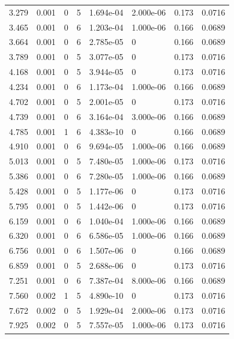 \documentclass[preview]{standalone}
\begin{document}
{{\begin{tabular}{L{1.2cm}C{1.2cm} C{0.3cm}C{0.5cm} C{1.4cm}C{1.4cm} C{1.4cm}C{1.4cm}}
  3.279  &  0.001  & 0     &  5 &  1.694e-04  & 2.000e-06  & 0.173 &  0.0716   \\ 
  3.465  &  0.001  & 0     &  6 &  1.203e-04  & 1.000e-06  & 0.166 &  0.0689   \\ 
  3.664  &  0.001  & 0     &  6 &  2.785e-05  & 0  & 0.166 &  0.0689   \\ 
  3.789  &  0.001  & 0     &  5 &  3.077e-05  & 0  & 0.173 &  0.0716   \\ 
  4.168  &  0.001  & 0     &  5 &  3.944e-05  & 0  & 0.173 &  0.0716   \\ 
  4.234  &  0.001  & 0     &  6 &  1.173e-04  & 1.000e-06  & 0.166 &  0.0689   \\ 
  4.702  &  0.001  & 0     &  5 &  2.001e-05  & 0  & 0.173 &  0.0716   \\ 
  4.739  &  0.001  & 0     &  6 &  3.164e-04  & 3.000e-06  & 0.166 &  0.0689   \\ 
  4.785  &  0.001  & 1     &  6 &  4.383e-10  & 0  & 0.166 &  0.0689   \\ 
  4.910  &  0.001  & 0     &  6 &  9.694e-05  & 1.000e-06  & 0.166 &  0.0689   \\ 
  5.013  &  0.001  & 0     &  5 &  7.480e-05  & 1.000e-06  & 0.173 &  0.0716   \\ 
  5.386  &  0.001  & 0     &  6 &  7.280e-05  & 1.000e-06  & 0.166 &  0.0689   \\ 
  5.428  &  0.001  & 0     &  5 &  1.177e-06  & 0  & 0.173 &  0.0716   \\ 
  5.795  &  0.001  & 0     &  5 &  1.442e-06  & 0  & 0.173 &  0.0716   \\ 
  6.159  &  0.001  & 0     &  6 &  1.040e-04  & 1.000e-06  & 0.166 &  0.0689   \\ 
  6.320  &  0.001  & 0     &  6 &  6.586e-05  & 1.000e-06  & 0.166 &  0.0689   \\ 
  6.756  &  0.001  & 0     &  6 &  1.507e-06  & 0  & 0.166 &  0.0689   \\ 
  6.859  &  0.001  & 0     &  5 &  2.688e-06  & 0  & 0.173 &  0.0716   \\ 
  7.251  &  0.001  & 0     &  6 &  7.387e-04  & 8.000e-06  & 0.166 &  0.0689   \\ 
  7.560  &  0.002  & 1     &  5 &  4.890e-10  & 0  & 0.173 &  0.0716   \\ 
  7.672  &  0.002  & 0     &  5 &  1.929e-04  & 2.000e-06  & 0.173 &  0.0716   \\ 
  7.925  &  0.002  & 0     &  5 &  7.557e-05  & 1.000e-06  & 0.173 &  0.0716   \\ 

\end{tabular}}}
\end{document}
